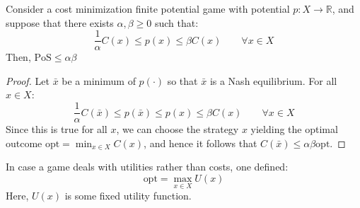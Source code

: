 \begin{proposition}
    Consider a cost minimization finite potential game with potential $p:X\rightarrow\mathbb{R}$, and suppose that there exists $\alpha,\beta\geq 0$ such that: 
    \[\dfrac{1}{\alpha}C(x)\leq p(x)\leq \beta C(x)\qquad \forall x \in X\]
    Then, $\text{PoS}\leq \alpha\beta$
\end{proposition}
\begin{proof}
    Let $\bar{x}$ be a minimum of $p(\cdot)$ so that $\bar{x}$ is a Nash equilibrium. 
    For all $x \in X$: 
    \[\dfrac{1}{\alpha}C(\bar{x})\leq p(\bar{x})\leq p(x)\leq \beta C(x)\qquad \forall x \in X\]
    Since this is true for all $x$, we can choose the strategy $x$ yielding the optimal outcome $\text{opt}=\min_{x\in X} C(x)$, and hence it follows that $C(\bar{x})\leq \alpha\beta\text{opt}$. 
\end{proof}
\noindent In case a game deals with utilities rather than costs, one defined: 
\[\text{opt}=\max_{x\in X}U(x)\]
Here, $U(x)$ is some fixed utility function.